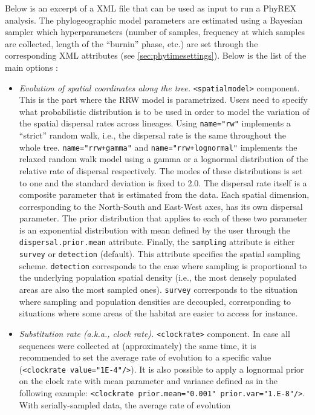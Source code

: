 \documentclass[a4paper,12pt]{article}
\newcommand{\x}[1]{\texttt{#1}}
\begin{document}
Below is an excerpt of a XML file that can be used as input to run a PhyREX analysis. The
phylogeographic model parameters are estimated using a Bayesian sampler which hyperparameters
(number of samples, frequency at which samples are collected, length of the ``burnin'' phase, etc.)
are set through the corresponding XML attributes (see \ref{sec:phytimesettings}). Below is the list
of the main options :
\begin{itemize}
\item {\em Evolution of spatial coordinates along the tree.} \x{<spatialmodel>} component. This is
  the part where the RRW model is parametrized. Users need to specify what probabilistic distribution is to be used in order to
  model the variation of the spatial dispersal rates across lineages. Using \x{name="rw"} implements
  a ``strict'' random walk, i.e., the dispersal rate is the same throughout the whole
  tree. \x{name="rrw+gamma"} and \x{name="rrw+lognormal"} implements the relaxed random walk model
  using a gamma or a lognormal distribution of the relative rate of dispersal respectively. The modes
  of these distributions is set to one and the standard deviation is fixed to 2.0. The dispersal
  rate itself is a composite parameter that is estimated from the data. Each spatial dimension,
  corresponding to the North-South and East-West axes, has its own dispersal parameter. The prior
  distribution that applies to each of these two parameter is an exponential distribution with mean defined by
  the user through the \x{dispersal.prior.mean} attribute. Finally, the \x{sampling} attribute is
  either \x{survey} or \x{detection} (default). This attribute specifies the spatial sampling
  scheme. \x{detection} corresponds to the case where sampling is proportional to the underlying
  population spatial density (i.e., the most densely populated areas are also the most sampled
  ones). \x{survey} corresponds to the situation where sampling and population densities are
  decoupled, corresponding to situations where some areas of the habitat are easier to access for instance.
\item {\em Substitution rate (a.k.a., clock rate).} \x{<clockrate>} component. In case all sequences were collected at (approximately) the same time, it is recommended to set the average rate
of evolution to a specific value (\x{<clockrate value="1E-4"/>}). It is also possible to apply a
lognormal prior on the clock rate with mean parameter and variance defined as in the following example: \x{<clockrate
prior.mean="0.001" prior.var="1.E-8"/>}. With serially-sampled data, the average rate of evolution

\end{itemize}
\end{document}
